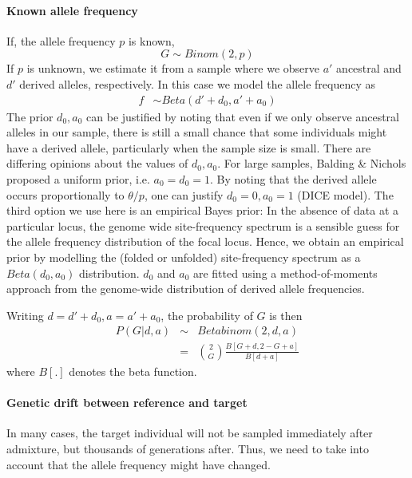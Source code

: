 \documentclass[10pt,a4paper]{article}
\begin{document}
\paragraph{Known allele frequency}
If, the allele frequency $p$ is known, 
\begin{equation}
G \sim Binom(2, p)
\end{equation}
If $p$ is unknown, we estimate it from a sample where we observe $a'$ ancestral and $d'$ derived alleles, respectively. In this case we model the allele frequency as
\begin{align}
f &\sim Beta(d' + d_0, a' + a_0)
\end{align}
The prior $d_0, a_0$ can be justified by noting that even if we only observe ancestral alleles in our sample, there is still a small chance that some individuals might have a derived allele, particularly when the sample size is small. There are differing opinions about the values of $d_0, a_0$. For large samples, Balding \& Nichols proposed a uniform prior, i.e. $a_0=d_0=1$. By noting that the derived allele occurs proportionally to $\theta/p$, one can justify $d_0=0, a_0=1$ (DICE model). The third option we use here is an empirical Bayes prior: In the absence of data at a particular locus, the genome wide site-frequency spectrum is a sensible guess for the allele frequency distribution of the focal locus. Hence, we obtain an empirical prior by modelling the (folded or unfolded) site-frequency spectrum as a $Beta(d_0, a_0)$ distribution. $d_0$ and $a_0$ are fitted using a method-of-moments approach from the genome-wide distribution of derived allele frequencies.


Writing $d = d' + d_0, a = a'+a_0$, the probability of $G$ is then
\begin{eqnarray}
P(G | d, a) &\sim& Betabinom(2, d, a)\nonumber\\
&=& \binom{2}{G} \frac{B[G+d, 2-G + a]}{B[ d + a]} \label{eq:ll:homo}
\end{eqnarray}
where $B[.]$ denotes the beta function.
\paragraph{Genetic drift between reference and target}
In many cases, the target individual will not be sampled immediately after admixture, but thousands of generations after. Thus, we need to take into account that the allele frequency might have changed.
\end{document}
